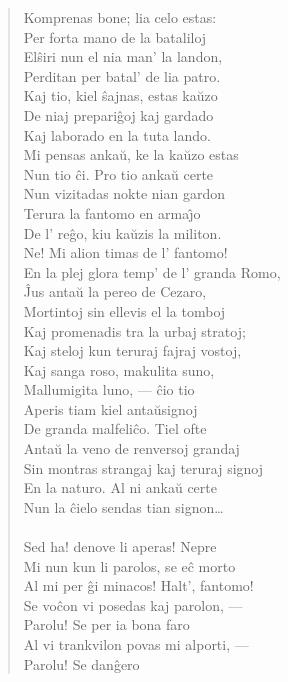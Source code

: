 \begin{verse}
Komprenas bone; lia celo estas:\\ Per forta mano de la bataliloj\\
El\^siri nun el nia man' la landon,\\ Perditan per batal' de lia
patro.\\ Kaj tio, kiel \^sajnas, estas ka\u uzo\\ De niaj
prepari\^goj kaj gardado\\ Kaj laborado en la tuta lando.\\
 Mi pensas anka\u u, ke la ka\u uzo estas\\ Nun
tio \^ci. Pro tio anka\u u certe\\ Nun vizitadas nokte nian gardon\\
Terura la fantomo en arma\^{\j}o\\ De l' reĝo, kiu ka\u uzis la
militon.\\
 Ne! Mi alion timas de l' fantomo!\\ En la plej glora
temp' de l' granda Romo,\\ \^Jus anta\u u la pereo de Cezaro,\\
Mortintoj sin ellevis el la tomboj\\ Kaj promenadis tra la urbaj
stratoj;\\ Kaj steloj kun teruraj fajraj vostoj,\\ Kaj sanga roso,
makulita suno,\\ Mallumigita luno, --- \^cio tio\\ Aperis tiam kiel
anta\u usignoj\\ De granda malfeli\^co. Tiel ofte\\ Anta\u u la veno
de renversoj grandaj\\ Sin montras strangaj kaj teruraj signoj\\ En
la naturo. Al ni anka\u u certe\\ Nun la \^cielo sendas tian
signon\dots\\
\\
 Sed ha! denove li aperas! Nepre\\ Mi nun kun li
parolos, se e\^c morto\\ Al mi per \^gi minacos! Halt', fantomo!\\
Se vo\^con vi posedas kaj parolon, ---\\ Parolu! Se per ia bona
faro\\ Al vi trankvilon povas mi alporti, ---\\ Parolu! Se dan\^gero

\end{verse}
